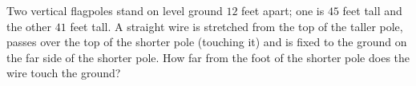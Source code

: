 Two vertical flagpoles stand on level ground $12$ feet apart; one is $45$ feet tall and the other $41$ feet tall. A straight wire is stretched from the top of the taller pole, passes over the top of the shorter pole (touching it) and is fixed to the ground on the far side of the shorter pole. How far from the foot of the shorter pole does the wire touch the ground?
